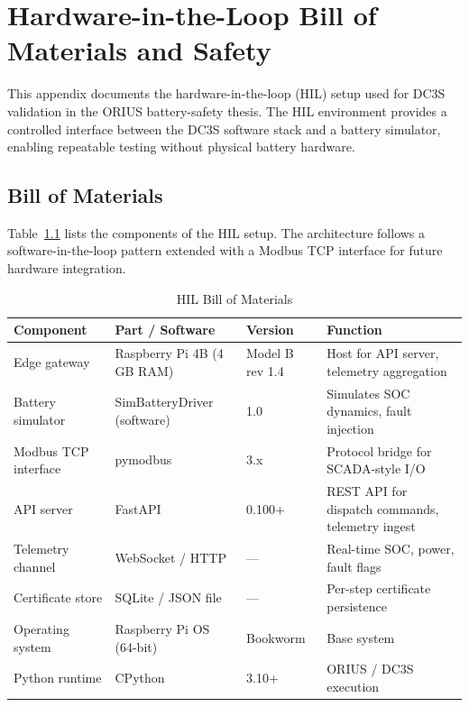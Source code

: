 \chapter{Hardware-in-the-Loop Bill of Materials and Safety}
\label{app:hil-bom-safety}

This appendix documents the hardware-in-the-loop (HIL) setup used for DC3S validation in the ORIUS battery-safety thesis. The HIL environment provides a controlled interface between the DC3S software stack and a battery simulator, enabling repeatable testing without physical battery hardware.

\section{Bill of Materials}

Table~\ref{tab:hil-bom} lists the components of the HIL setup. The architecture follows a software-in-the-loop pattern extended with a Modbus TCP interface for future hardware integration.

\begin{table}[htbp]
\centering
\caption{HIL Bill of Materials}
\label{tab:hil-bom}
\begin{tabular}{@{}lllp{4.5cm}@{}}
\toprule
\textbf{Component} & \textbf{Part / Software} & \textbf{Version} & \textbf{Function} \\
\midrule
Edge gateway & Raspberry Pi 4B (4\,GB RAM) & Model B rev 1.4 & Host for API server, telemetry aggregation \\
Battery simulator & SimBatteryDriver (software) & 1.0 & Simulates SOC dynamics, fault injection \\
Modbus TCP interface & pymodbus & 3.x & Protocol bridge for SCADA-style I/O \\
API server & FastAPI & 0.100+ & REST API for dispatch commands, telemetry ingest \\
Telemetry channel & WebSocket / HTTP & --- & Real-time SOC, power, fault flags \\
Certificate store & SQLite / JSON file & --- & Per-step certificate persistence \\
Operating system & Raspberry Pi OS (64-bit) & Bookworm & Base system \\
Python runtime & CPython & 3.10+ & ORIUS / DC3S execution \\
\bottomrule
\end{tabular}
\end{table}

